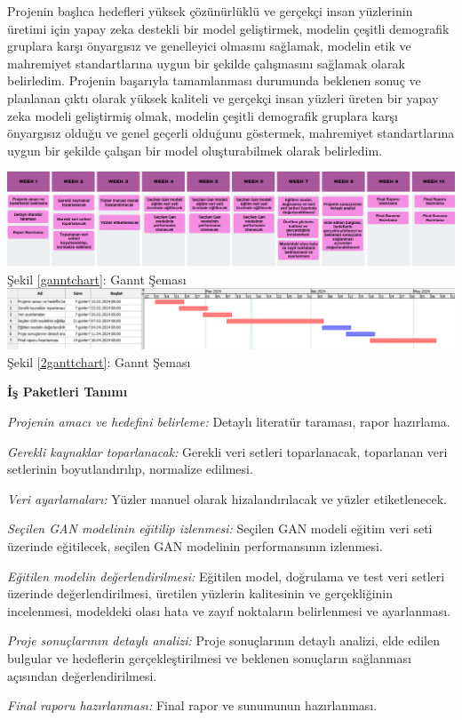 \documentclass[12pt, a4paper]{article}
\begin{document}
	\begin{flushleft}
		Projenin başlıca hedefleri yüksek çözünürlüklü ve gerçekçi insan yüzlerinin üretimi için yapay zeka destekli bir model geliştirmek, modelin çeşitli demografik gruplara karşı önyargısız ve genelleyici olmasını sağlamak, modelin etik ve mahremiyet standartlarına uygun bir şekilde çalışmasını sağlamak olarak belirledim.
	Projenin başarıyla tamamlanması durumunda beklenen sonuç ve planlanan çıktı olarak yüksek kaliteli ve gerçekçi insan yüzleri üreten bir yapay zeka modeli geliştirmiş olmak, modelin çeşitli demografik gruplara karşı önyargısız olduğu ve genel geçerli olduğunu göstermek, mahremiyet standartlarına uygun bir şekilde çalışan bir model oluşturabilmek olarak belirledim.
	
	\includegraphics[width=1\textwidth]{ganntchart}
	\label{ganntchart}
	Şekil \ref{ganntchart}: Gannt Şeması
	\newpage
	\includegraphics[width=1\textwidth]{2ganttchart}
	\label{2ganttchart}
	Şekil \ref{2ganttchart}: Gannt Şeması
	
	
	\textbf{İş Paketleri Tanımı}
	
	\textit{Projenin amacı ve hedefini belirleme:} Detaylı literatür taraması, rapor hazırlama.
	
    \textit{Gerekli kaynaklar toparlanacak:} Gerekli veri setleri toparlanacak, toparlanan veri setlerinin boyutlandırılıp, normalize edilmesi.
	
	\textit{Veri ayarlamaları:} Yüzler manuel olarak hizalandırılacak ve yüzler etiketlenecek.
	
	\textit{Seçilen GAN modelinin eğitilip izlenmesi:} Seçilen GAN modeli eğitim veri seti üzerinde eğitilecek, seçilen GAN modelinin performansının izlenmesi.
    
    \textit{Eğitilen modelin değerlendirilmesi:} Eğitilen model, doğrulama ve test veri setleri üzerinde değerlendirilmesi, üretilen yüzlerin kalitesinin ve gerçekliğinin incelenmesi, modeldeki olası hata ve zayıf noktaların belirlenmesi ve ayarlanması.
	
	\textit{Proje sonuçlarının detaylı analizi:} Proje sonuçlarının detaylı analizi, elde edilen bulgular ve hedeflerin gerçekleştirilmesi ve beklenen sonuçların sağlanması açısından değerlendirilmesi.
	
	\textit{Final raporu hazırlanması:} Final rapor ve sunumunun hazırlanması.
	\newpage
	\end{flushleft}
	\begin{center}
		
	
	\end{center}
\end{document}
